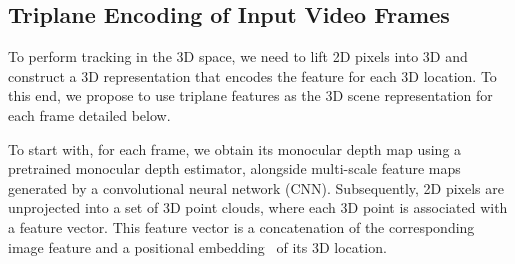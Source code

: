 



\subsection{Triplane Encoding of Input Video Frames}
\label{sec:fte}

To perform tracking in the 3D space, we need to lift 2D pixels into 3D and construct a 3D representation that encodes the feature for each 3D location. To this end, we propose to use triplane features as the 3D scene representation for each frame detailed below.

To start with, for each frame, we obtain its monocular depth map using a pretrained monocular depth estimator, alongside multi-scale feature maps generated by a convolutional neural network (CNN). Subsequently, 2D pixels are unprojected into a set of 3D point clouds, where each 3D point is associated with a feature vector. This feature vector is a concatenation of the corresponding image feature and a positional embedding~\cite{vaswani2017attention} of its 3D location.
 
